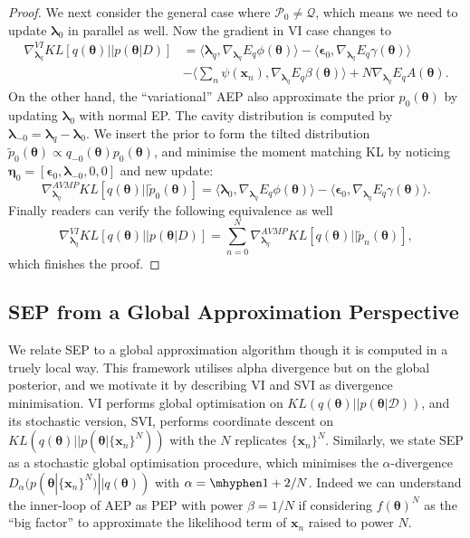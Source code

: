 \documentclass{article} %
\begin{document}
\begin{proof}
We next consider the general case where $\mathcal{P}_0 \neq \mathcal{Q}$, which means we need to update $\bm{\lambda}_0$ in parallel as well. Now the gradient in VI case changes to
\begin{equation}
\begin{aligned}
\nabla_{\bm{\lambda}_q}^{VI} KL[q(\bm{\theta}) || p(\bm{\theta} | D)] &= \langle \bm{\lambda}_q, \nabla_{\bm{\lambda}_q} E_q \phi(\bm{\theta}) \rangle - \langle \bm{\epsilon}_0, \nabla_{\bm{\lambda}_q} E_q \gamma(\bm{\theta}) \rangle \\
	&- \langle \sum_{n} \psi(\bm{x}_n), \nabla_{\bm{\lambda}_q} E_q \beta(\bm{\theta}) \rangle + N \nabla_{\bm{\lambda}_q} E_q A(\bm{\theta}).
\end{aligned}
\end{equation}
On the other hand, the ``variational'' AEP also approximate the prior $p_0(\bm{\theta})$ by updating $\bm{\lambda}_0$ with normal EP. The cavity distribution is computed by $\bm{\lambda}_{-0} = \bm{\lambda}_q - \bm{\lambda}_0$. We insert the prior to form the tilted distribution $\tilde{p}_0(\bm{\theta}) \propto q_{-0}(\bm{\theta}) p_0(\bm{\theta})$, and minimise the moment matching KL by noticing $\bm{\eta}_0 = [\bm{\epsilon}_0, \bm{\lambda}_{-0}, 0, 0]$ and new update:
\begin{equation}
\nabla_{\bm{\lambda}_q}^{AVMP} KL[q(\bm{\theta}) || \tilde{p}_0(\bm{\theta})] = \langle \bm{\lambda}_0, \nabla_{\bm{\lambda}_q} E_q \phi(\bm{\theta}) \rangle - \langle \bm{\epsilon}_0, \nabla_{\bm{\lambda}_q} E_q \gamma(\bm{\theta}) \rangle.
\end{equation}
Finally readers can verify the following equivalence as well
\begin{equation}
\nabla_{\bm{\lambda}_q}^{VI} KL[q(\bm{\theta}) || p(\bm{\theta} | D)] = \sum_{n=0}^N \nabla_{\bm{\lambda}_q}^{AVMP} KL[q(\bm{\theta}) || \tilde{p}_n(\bm{\theta})],
\end{equation}
which finishes the proof.
\end{proof}

%
\subsection{SEP from a Global Approximation Perspective}
We relate SEP to a global approximation algorithm though it is computed in a truely local way. This framework utilises alpha divergence but on the global posterior, and we motivate it by describing VI and SVI as divergence minimisation.
%
VI performs global optimisation on $KL(q(\bm{\theta})||p(\bm{\theta}|\mathcal{D}))$, and its stochastic version, SVI, performs coordinate descent on $KL(q(\bm{\theta}) || p(\bm{\theta} | \{\bm{x}_n\}^N))$ with the $N$ replicates $\{\bm{x}_n\}^N$. Similarly, we state SEP as a stochastic global optimisation procedure, which minimises the $\alpha$-divergence $D_{\alpha}(p(\bm{\theta} | \{\bm{x}_n\}^N) || q(\bm{\theta}))$ with $\alpha = \mhyphen 1 + 2/N$. Indeed we can understand the inner-loop of AEP as PEP with power $\beta = 1/N$ if considering $f(\bm{\theta})^N$ as the ``big factor'' to approximate the likelihood term of $\bm{x}_n$ raised to power $N$.
\end{document}
